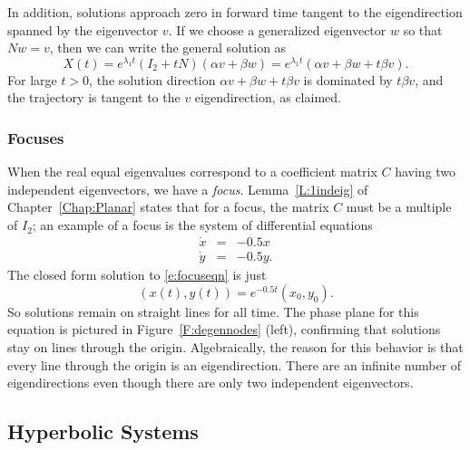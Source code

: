 \documentclass{ximera}
\begin{document}
In addition, solutions approach zero in forward time tangent to
the eigendirection spanned by the eigenvector $v$.  If we choose
a generalized eigenvector $w$ so that $Nw=v$, then we can write the
general solution as
\[
X(t) =  e^{\lambda_1 t}(I_2 + tN)(\alpha v+\beta w) =
e^{\lambda_1 t}\left(\alpha v + \beta w +  t\beta v \right).
\]
For large $t>0$, the solution direction $\alpha v + \beta w + t\beta v$ is
dominated by $t\beta v$, and the trajectory is tangent to the $v$
eigendirection, as claimed.


\subsubsection*{Focuses}

When the real equal eigenvalues correspond to a coefficient matrix $C$
having two independent eigenvectors, we have a {\em focus\/}.
Lemma~\ref{L:1indeig} of Chapter~\ref{Chap:Planar} states that for a focus,
the matrix $C$ must be a multiple of $I_2$; an example of a focus is the
system of differential equations
\begin{equation}  \label{e:focuseqn}
\begin{array}{rcl}
\dot{x} & = & -0.5x \\
\dot{y} & = & -0.5y.
\end{array}
\end{equation}
The closed form solution to \eqref{e:focuseqn} is just
\[
(x(t),y(t)) = e^{-0.5t}(x_0,y_0).
\]
So solutions remain on straight lines for all time.  The phase
plane for this equation is
pictured in Figure~\ref{F:degennodes}
(left), confirming that solutions stay on lines through the
origin.  Algebraically, the reason for this behavior is that every
line through the origin is an eigendirection.  There are an infinite number
of eigendirections even though there are only two independent eigenvectors.

\begin{figure*}[htb]
           \centerline{%
           }
           \caption{(Left) Phase plane of a focus.
	(Right) Time series of a focus.}
           \label{F:degennodes}
\end{figure*}

\subsection*{Hyperbolic Systems}
\end{document}
